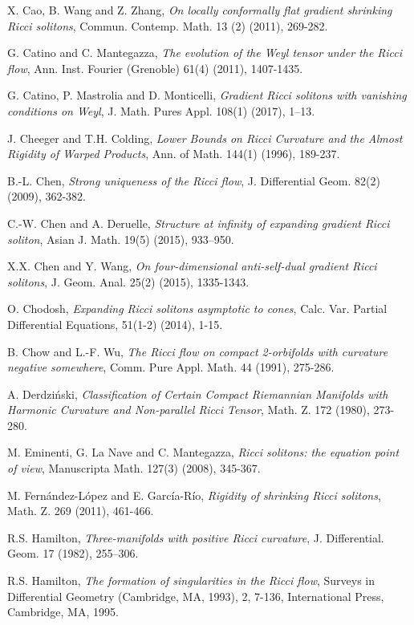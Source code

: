 \documentclass{amsart}
\theoremstyle{definition}
\theoremstyle{remark}
\numberwithin{equation}{section}
\begin{document}
\begin{thebibliography}{30}
		 X. Cao, B. Wang and Z. Zhang, {\em On locally conformally flat gradient shrinking Ricci solitons}, 
		Commun. Contemp. Math. 13 (2) (2011), 269-282.
		
		 G. Catino and C. Mantegazza, {\em The evolution of the Weyl tensor under the Ricci flow},
		Ann. Inst. Fourier (Grenoble) 61(4) (2011), 1407-1435.
		
		 G. Catino, P. Mastrolia and D. Monticelli,  {\em Gradient Ricci solitons with vanishing conditions on Weyl}, J. Math. Pures Appl. 108(1) (2017), 1–13.
		
		 J. Cheeger and T.H. Colding, {\em Lower Bounds on Ricci Curvature and the Almost Rigidity of Warped Products}, Ann. of Math. 144(1) (1996), 189-237.
		
		 B.-L. Chen, {\em Strong uniqueness of the Ricci flow}, J. Differential Geom. 82(2) (2009),
		362-382. 
		
		 C.-W. Chen and A. Deruelle, {\em Structure at infinity of expanding gradient Ricci soliton}, Asian J. Math.
		19(5) (2015), 933–950.
		
		 X.X. Chen and Y. Wang, {\em On four-dimensional anti-self-dual gradient Ricci solitons},
		J. Geom. Anal. 25(2) (2015), 1335-1343.
	
		 O. Chodosh, {\em Expanding Ricci solitons asymptotic to cones}, Calc. Var. Partial Differential Equations, 51(1-2) (2014), 1-15.
		
		 B. Chow and L.-F. Wu, {\em The Ricci flow on compact 2-orbifolds with curvature negative somewhere}, Comm. Pure Appl. Math. 44 (1991), 275-286.
		
		 A. Derdzi\'{n}ski, {\em Classification of Certain Compact Riemannian Manifolds with Harmonic Curvature and Non-parallel Ricci Tensor}, Math. Z. 172  (1980), 273-280.
		
		 M. Eminenti, G. La Nave and C. Mantegazza, {\em Ricci solitons: the equation point of view}, Manuscripta Math. 127(3) (2008), 345-367.
		
		 M. Fern\'{a}ndez-L\'{o}pez and E. Garc\'{i}a-R\'{i}o, {\em Rigidity of shrinking Ricci solitons},
		 Math. Z. 269 (2011), 461-466.
		
		  R.S. Hamilton, {\em Three-manifolds with positive
			Ricci curvature}, J. Differential. Geom. 17 (1982), 255--306.
		
		 R.S. Hamilton, {\em  The formation of singularities in
			the Ricci flow}, Surveys in Differential Geometry (Cambridge, MA,
		1993), 2, 7-136, International Press, Cambridge, MA, 1995.
		

\end{thebibliography}
\end{document}
